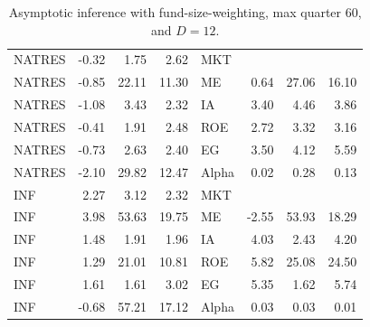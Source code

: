 \documentclass[12pt]{article}
\begin{document}
\begin{table}[ht]
\begin{tabular}{lrrrlrrr}
		NATRES & -0.32 & 1.75 & 2.62 & MKT &  &  &  \\ 
		NATRES & -0.85 & 22.11 & 11.30 & ME & 0.64 & 27.06 & 16.10 \\ 
		NATRES & -1.08 & 3.43 & 2.32 & IA & 3.40 & 4.46 & 3.86 \\ 
		NATRES & -0.41 & 1.91 & 2.48 & ROE & 2.72 & 3.32 & 3.16 \\ 
		NATRES & -0.73 & 2.63 & 2.40 & EG & 3.50 & 4.12 & 5.59 \\ 
		NATRES & -2.10 & 29.82 & 12.47 & Alpha & 0.02 & 0.28 & 0.13 \\ 
		INF & 2.27 & 3.12 & 2.32 & MKT &  &  &  \\ 
		INF & 3.98 & 53.63 & 19.75 & ME & -2.55 & 53.93 & 18.29 \\ 
		INF & 1.48 & 1.91 & 1.96 & IA & 4.03 & 2.43 & 4.20 \\ 
		INF & 1.29 & 21.01 & 10.81 & ROE & 5.82 & 25.08 & 24.50 \\ 
		INF & 1.61 & 1.61 & 3.02 & EG & 5.35 & 1.62 & 5.74 \\ 
		INF & -0.68 & 57.21 & 17.12 & Alpha & 0.03 & 0.03 & 0.01 \\ 
		\hline
	\end{tabular}
	\caption{Asymptotic inference with fund-size-weighting, max quarter 60, and $D=12$.} 
	\label{tab:ai_60_fw}
\end{table}
\end{document}
